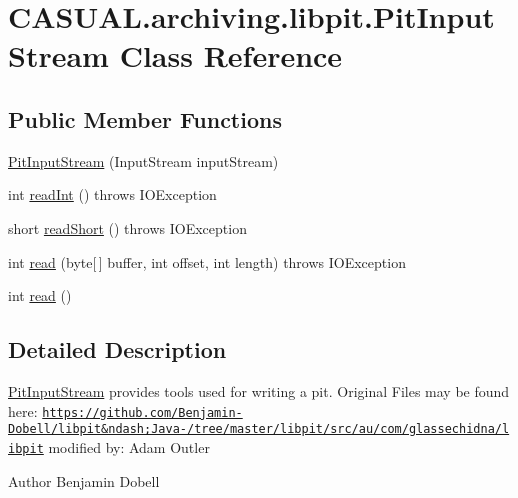 \hypertarget{classCASUAL_1_1archiving_1_1libpit_1_1PitInputStream}{\section{C\-A\-S\-U\-A\-L.\-archiving.\-libpit.\-Pit\-Input\-Stream Class Reference}
\label{classCASUAL_1_1archiving_1_1libpit_1_1PitInputStream}
}
\subsection*{Public Member Functions}
\begin{DoxyCompactItemize}
\item 
\hyperlink{classCASUAL_1_1archiving_1_1libpit_1_1PitInputStream_ace85a9c91595391bfe159a6e6a153827}{Pit\-Input\-Stream} (Input\-Stream input\-Stream)
\item 
int \hyperlink{classCASUAL_1_1archiving_1_1libpit_1_1PitInputStream_abba0bb2226797c2f0d6c9436a96f640b}{read\-Int} ()  throws I\-O\-Exception 
\item 
short \hyperlink{classCASUAL_1_1archiving_1_1libpit_1_1PitInputStream_a14b405dae50f11155d6e103060c030c8}{read\-Short} ()  throws I\-O\-Exception 
\item 
int \hyperlink{classCASUAL_1_1archiving_1_1libpit_1_1PitInputStream_afc530392ae793883b5a1f620440ab9fa}{read} (byte\mbox{[}$\,$\mbox{]} buffer, int offset, int length)  throws I\-O\-Exception 
\item 
int \hyperlink{classCASUAL_1_1archiving_1_1libpit_1_1PitInputStream_ad47d7e44758ae65cdf4aca98443b00cd}{read} ()
\end{DoxyCompactItemize}


\subsection{Detailed Description}
\hyperlink{classCASUAL_1_1archiving_1_1libpit_1_1PitInputStream}{Pit\-Input\-Stream} provides tools used for writing a pit. Original Files may be found here\-: \href{https://github.com/Benjamin-Dobell/libpit&ndash;Java-/tree/master/libpit/src/au/com/glassechidna/libpit}{\tt https\-://github.\-com/\-Benjamin-\/\-Dobell/libpit\&ndash;\-Java-\//tree/master/libpit/src/au/com/glassechidna/libpit} modified by\-: Adam Outler

\begin{DoxyAuthor}{Author}
Benjamin Dobell 
\end{DoxyAuthor}


